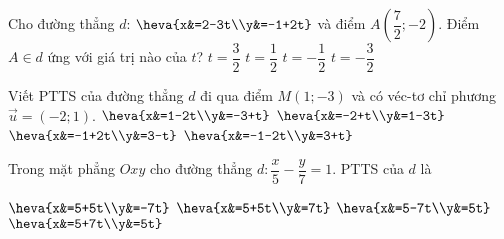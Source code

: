 \begin{ex}%
	Cho đường thẳng $d$: $\heva{x&=2-3t\\y&=-1+2t}$ và điểm $A\left(\dfrac{7}{2};-2\right)$. Điểm $A\in d$ ứng với giá trị nào của $t$?
	\choice
	{$t=\dfrac{3}{2}$}
	{$t=\dfrac{1}{2}$}
	{\True $t=-\dfrac{1}{2}$}
	{$t=-\dfrac{3}{2}$}
\end{ex}

\begin{ex}%
	Viết PTTS của đường thẳng $d$ đi qua điểm $M(1;-3)$ và có véc-tơ chỉ phương $\overrightarrow{u}=(-2;1)$.
	\choice
	{\True $\heva{x&=1-2t\\y&=-3+t}$}
	{$\heva{x&=-2+t\\y&=1-3t}$}
	{$\heva{x&=-1+2t\\y&=3-t}$}
	{$\heva{x&=-1-2t\\y&=3+t}$}
\end{ex}


\begin{ex}%
	Trong mặt phẳng $Oxy$ cho đường thẳng $d\colon \dfrac{x}{5}-\dfrac{y}{7}=1$. PTTS của $d$ là
	
	\choice
	{$\heva{x&=5+5t\\y&=-7t}$}
	{\True $\heva{x&=5+5t\\y&=7t}$}
	{$\heva{x&=5-7t\\y&=5t}$}
	{$\heva{x&=5+7t\\y&=5t}$}
\end{ex}

